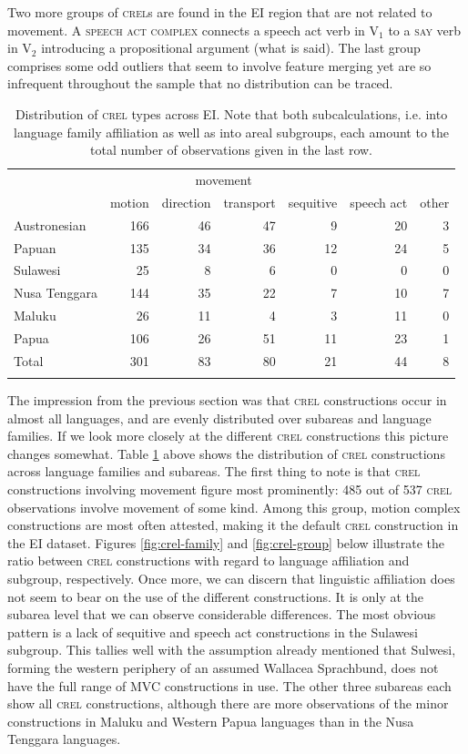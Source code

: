 Two more groups of \textsc{crel}s are found in the EI region that are not related to movement. A \textsc{speech act complex} connects a speech act verb in V$_1$ to a \textsc{say} verb in V$_2$ introducing a propositional argument (what is said). The last group comprises some odd outliers that seem to involve feature merging yet are so infrequent throughout the sample that no distribution can be traced.

\begin{table}
\begin{tabular}{lrrrr|rr}
  \lsptoprule
& \multicolumn{4}{c}{movement} & & \\
 & {motion} & {direction} & {transport} & {sequitive} & {speech act} & {other}\\  
  \hline
  Austronesian & 166 & 46 & 47 & 9 & 20 & 3 \tabularnewline
  Papuan & 135 & 34 &  36 &  12 & 24 & 5 \tabularnewline
   \hline
  Sulawesi & 25 & 8 & 6 & 0 & 0 & 0 \tabularnewline
  Nusa Tenggara & 144 & 35 & 22 & 7 & 10 & 7 \tabularnewline
  Maluku & 26 & 11 & 4 & 3 & 11 & 0 \tabularnewline 
  Papua & 106 & 26 & 51 & 11 & 23 & 1 \tabularnewline 
\hline
Total & 301 & 83 & 80 & 21 & 44 & 8 \tabularnewline
\lspbottomrule
\end{tabular}
\caption[Distribution of \textsc{crel} types]{Distribution of \textsc{crel} types across EI. Note that both subcalculations, i.e. into language family affiliation as well as into areal subgroups, each amount to the total number of observations given in the last row.}
\label{table:CREL_overview}
\end{table}

The impression from the previous section was that \textsc{crel} constructions occur in almost all languages, and are evenly distributed over subareas and language families. If we look more closely at the different \textsc{crel} constructions this picture changes somewhat. Table \ref{table:CREL_overview} above shows the distribution of \textsc{crel} constructions across language families and subareas. The first thing to note is that \textsc{crel} constructions involving movement figure most prominently: 485 out of 537 \textsc{crel} observations involve movement of some kind. Among this group, motion complex constructions are most often attested, making it the default \textsc{crel} construction in the EI dataset. Figures \ref{fig:crel-family} and \ref{fig:crel-group} below illustrate the ratio between \textsc{crel} constructions with regard to language affiliation and subgroup, respectively. Once more, we can discern that linguistic affiliation does not seem to bear on the use of the different constructions. It is only at the subarea level that we can observe considerable differences. The most obvious pattern is a lack of sequitive and speech act constructions in the Sulawesi subgroup. This tallies well with the assumption already mentioned that Sulwesi, forming the western periphery of an assumed Wallacea Sprachbund, does not have the full range of MVC constructions in use. The other three subareas each show all \textsc{crel} constructions, although there are more observations of the minor constructions in Maluku and Western Papua languages than in the Nusa Tenggara languages.

